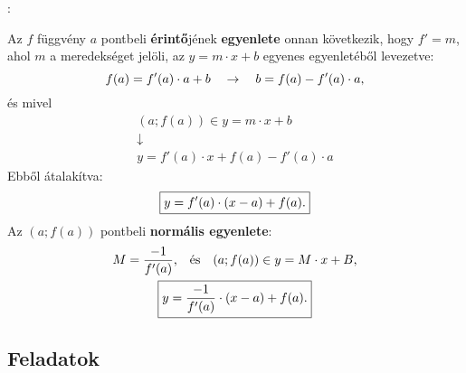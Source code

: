 \documentclass[a4paper, 12pt]{scrartcl}
\begin{document}
\begin{blueBox}
  :

  Az $f$ függvény $a$ pontbeli \textbf{érintő}jének \textbf{egyenlete} onnan
  következik, hogy $f' = m$, ahol $m$ a meredekséget jelöli, az $y = m \cdot x
    + b$ egyenes egyenletéből levezetve:
  \[
    f(a) = f'(a) \cdot a + b
    \quad \rightarrow \quad
    b = f(a) - f'(a) \cdot a
    \text,
  \]
  és mivel
  \begin{gather*}
    (a; f(a)) \in y = m \cdot x + b
    \\
    \downarrow
    \\
    y = f'(a) \cdot x + f(a) - f'(a) \cdot a
  \end{gather*}
  Ebből átalakítva:
  \[
    \boxed{
      y = f'(a)\cdot (x-a) + f(a)
      \text.
    }
  \]
  Az $(a; f(a))$ pontbeli \textbf{normális egyenlete}:
  \begin{gather*}
    M = \frac{-1}{f'(a)}
    \text, \quad \text{és} \quad
    (a; f(a)) \in y = M \cdot x + B
    \text,
    \\
    \boxed{
      y = \frac{-1}{f'(a)} \cdot (x-a) + f(a)
      \text.
    }
  \end{gather*}
\end{blueBox}

\clearpage
\subsection{Feladatok}
\end{document}
